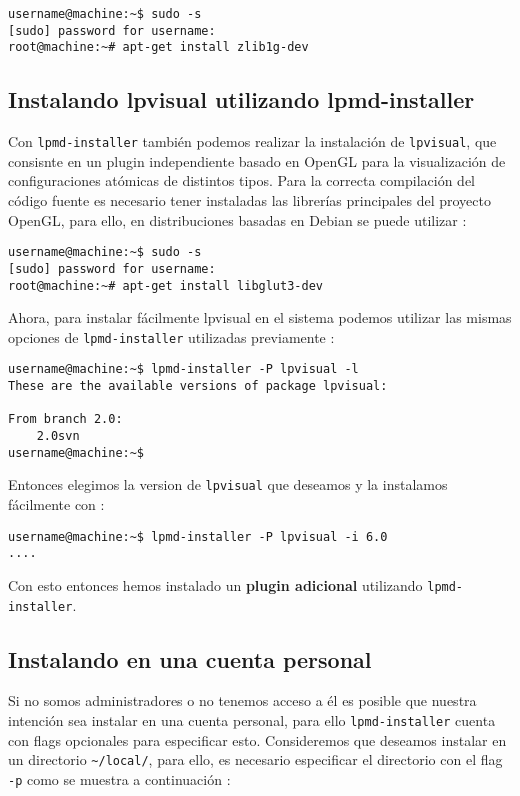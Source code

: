 \begin{verbatim}
username@machine:~$ sudo -s
[sudo] password for username: 
root@machine:~# apt-get install zlib1g-dev
\end{verbatim}


\subsection{Instalando lpvisual utilizando lpmd-installer}

Con \verb|lpmd-installer| tambi\'en podemos realizar la instalaci\'on de \verb|lpvisual|, que consisnte en un plugin independiente basado en OpenGL para la visualizaci\'on de configuraciones at\'omicas de distintos tipos. Para la correcta compilaci\'on del c\'odigo fuente es necesario tener instaladas las librer\'ias principales del proyecto OpenGL, para ello, en distribuciones basadas en Debian se puede utilizar :

\begin{verbatim}
username@machine:~$ sudo -s
[sudo] password for username: 
root@machine:~# apt-get install libglut3-dev
\end{verbatim}

Ahora, para instalar f\'acilmente lpvisual en el sistema podemos utilizar las mismas opciones de \verb|lpmd-installer| utilizadas previamente :

\begin{verbatim}
username@machine:~$ lpmd-installer -P lpvisual -l
These are the available versions of package lpvisual:

From branch 2.0: 
    2.0svn
username@machine:~$  
\end{verbatim}

Entonces elegimos la version de \verb|lpvisual| que deseamos y la instalamos f\'acilmente con :

\begin{verbatim}
username@machine:~$ lpmd-installer -P lpvisual -i 6.0
....
\end{verbatim}

Con esto entonces hemos instalado un \textbf{plugin adicional} utilizando \verb|lpmd-installer|.

\subsection{Instalando {\lpmd} en una cuenta personal}

Si no somos administradores o no tenemos acceso a \'el es posible que nuestra intenci\'on sea instalar {\lpmd} en una cuenta personal, para ello \verb|lpmd-installer| cuenta con flags opcionales para especificar esto. Consideremos que deseamos instalar {\lpmd} en un directorio \verb|~/local/|, para ello, es necesario especificar el directorio con el flag \verb|-p| como se muestra a continuaci\'on :


